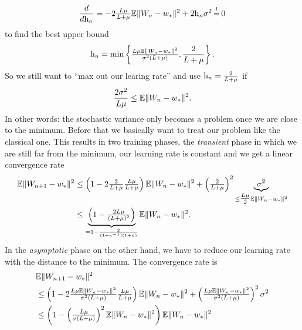 \begin{align*}
	\frac{d}{d\lr_n}
	= -2\tfrac{\ubound\lbound}{\ubound+\lbound}
	\E\|\Weights_n - \minimum\|^2 + 2\lr_n \stdBound^2
	\xeq{!} 0
\end{align*}
to find the best upper bound
\begin{align}\label{eq: optimal learning rate SGD}
	\text{h}_n
	= \min\left\{
		\tfrac{L\mu\mathbb{E}\|W_n - w_*\|^2}{\sigma^2(L+\mu)},
		\frac{2}{L+\mu}
	\right\}.
\end{align}
So we still want to ``max out our learing rate'' and use
\(\text{h}_n=\tfrac{2}{L+\mu}\) if
\begin{align*}
	\frac{2\sigma^2}{L\mu} \le \mathbb{E}\|W_n - w_*\|^2.
\end{align*}
In other words: the stochastic variance only becomes a problem once we are
close to the minimum. Before that we basically want to treat our problem like
the classical one. This results in two training phases, the \emph{transient}
phase in which we are still far from the minimum, our learning rate is constant
and we get a linear convergence rate
\begin{align*}
	\mathbb{E}\|W_{n+1} - w_*\|^2
	&\le \left(1-2\tfrac{2}{L+\mu}\tfrac{L\mu}{L+\mu}\right)
	\mathbb{E}\|W_n - w_*\|^2 + \left(\tfrac{2}{L+\mu}\right)^2
	\underbrace{\sigma^2}_{
		\le\tfrac{L\mu}{2} \mathbb{E}\|W_n - w_*\|^2
	}\\
	&\le \underbrace{
		\left(1-\tfrac{2L\mu}{(L+\mu)^2}\right)
	}_{
		=1-\frac{2}{(1+\kappa^{-1})(1+\kappa)}
	}
	\mathbb{E}\|W_n - w_*\|^2.
\end{align*}
In the \emph{asymptotic} phase on the other hand, we have to reduce our learning
rate with the distance to the minimum. The convergence rate is
\begin{align*}
	&\mathbb{E}\|W_{n+1} - w_*\|^2\\
	&\le \left(1-2
		\tfrac{L\mu\mathbb{E}\|W_n - w_*\|^2}{\sigma^2(L+\mu)}
		\tfrac{L\mu}{L+\mu}
	\right)
	\mathbb{E}\|W_n - w_*\|^2
	+ \left(
		\tfrac{L\mu\mathbb{E}\|W_n - w_*\|^2}{\sigma^2(L+\mu)}
	\right)^2
	\sigma^2\\
	&\le \left(1-
		\left(\tfrac{L\mu}{\sigma(L+\mu)}\right)^2
		\mathbb{E}\|W_n - w_*\|^2
	\right)
	\mathbb{E}\|W_n - w_*\|^2
\end{align*}
